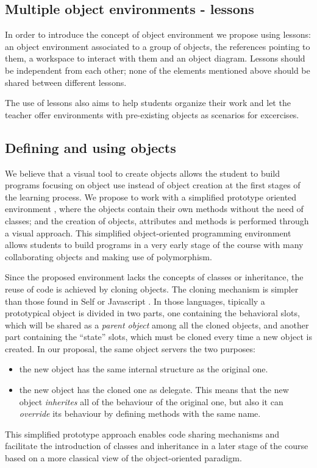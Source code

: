 \documentclass{sigplanconf}
\begin{document}
\subsection{Multiple object environments - lessons}

In order to introduce the concept of object environment we propose using lessons: an object environment associated to a group of objects, the references pointing to them, a workspace to interact with them and an object diagram. Lessons should be independent from each other; none of the elements mentioned above should be shared between different lessons.

The use of lessons also aims to help students organize their work and let the teacher offer environments with pre-existing objects as scenarios for excercises.

\subsection{Defining and using objects}
We believe that a visual tool to create objects allows the student to build programs focusing on object use instead of object creation at the first stages of the learning process. We propose to work with a simplified prototype oriented environment \cite{Wilk02,Mads96}, where the objects contain their own methods without the need of classes; and the creation of objects, attributes and methods is performed through a visual approach. This simplified object-oriented programming environment allows students to build programs in a very early stage of the course with many collaborating objects and making use of polymorphism.

Since the proposed environment lacks the concepts of classes or inheritance, the
reuse of code is achieved by cloning objects. The cloning mechanism is simpler
than those found in Self \cite{Unga07} or Javascript \cite{Wilk02}. In those languages, tipically a
prototypical object is divided in two parts, one containing the behavioral
slots, which will be shared as a \textit{parent object} among all the cloned
objects, and another part containing the ``state'' slots, which must be cloned every time a new object is created. In our proposal, the same object servers the two purposes: 
\begin{itemize}
\item the new object has the same internal structure as the original one. 
\item the new object has the cloned one as delegate. This means that the new
object \textit{inherites} all of the behaviour of the original one, but also it can \textit{override} its behaviour by defining methods with the same name.
\end{itemize}	
This simplified prototype approach enables code sharing mechanisms and facilitate the introduction of classes and inheritance in a later stage of the course based on a more classical view of the object-oriented paradigm.
\end{document}
